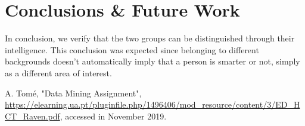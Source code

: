 \documentclass[conference]{IEEEtran}
\begin{document}
\section{Conclusions \& Future Work}
In conclusion, we verify that the two groups can be distinguished through their intelligence. This conclusion was expected since belonging to different backgrounds doesn't automatically imply that a person is smarter or not, simply as a different area of interest.








\begin{thebibliography}{00}
 A. Tomé, "Data Mining Assignment", \url{https://elearning.ua.pt/pluginfile.php/1496406/mod_resource/content/3/ED_HCT_Raven.pdf}, accessed in November 2019.
\end{thebibliography}
\vspace{12pt}
\end{document}
